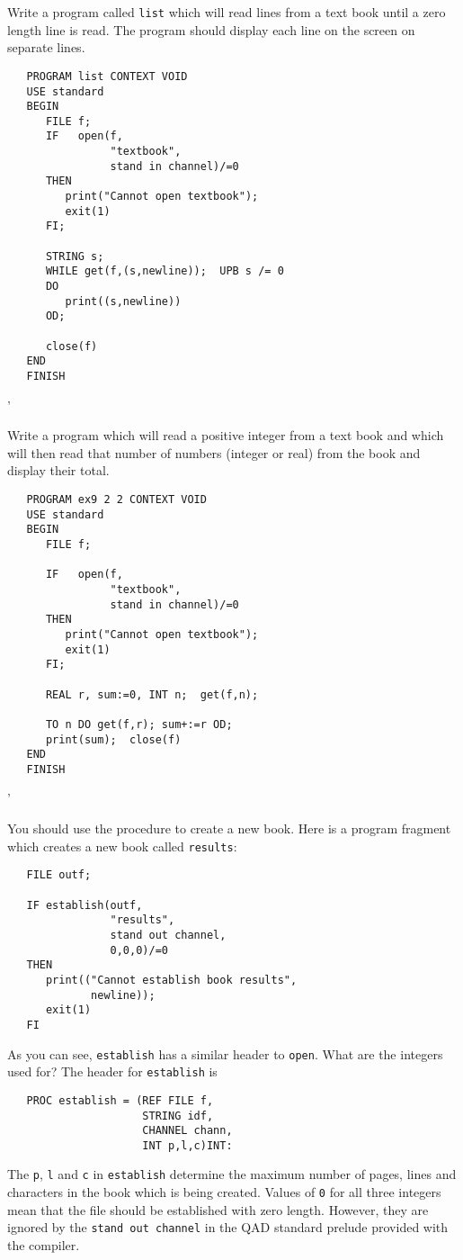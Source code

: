 \begin{exercise}
\item Write a program called \verb|list| which will read lines from a
text book until a zero length line is read.  The program should
display each line on the screen on separate lines.
\ans \ %
\begin{verbatim}
   PROGRAM list CONTEXT VOID
   USE standard
   BEGIN
      FILE f;
      IF   open(f,
                "textbook",
                stand in channel)/=0
      THEN
         print("Cannot open textbook");
         exit(1)
      FI;

      STRING s;
      WHILE get(f,(s,newline));  UPB s /= 0
      DO
         print((s,newline))
      OD;

      close(f)
   END
   FINISH
\end{verbatim}
'
\item Write a program which will read a positive integer from a text
book and which will then read that number of numbers (integer or
real) from the book and display their total.
\ans \ %
\begin{verbatim}
   PROGRAM ex9 2 2 CONTEXT VOID
   USE standard
   BEGIN
      FILE f;

      IF   open(f,
                "textbook",
                stand in channel)/=0
      THEN
         print("Cannot open textbook");
         exit(1)
      FI;

      REAL r, sum:=0, INT n;  get(f,n);

      TO n DO get(f,r); sum+:=r OD;
      print(sum);  close(f)
   END
   FINISH
\end{verbatim}
'
\end{exercise}

You should use the  procedure to create a new book.
Here is a program fragment which creates a new book called
\verb|results|:
\begin{verbatim}
   FILE outf;

   IF establish(outf,
                "results",
                stand out channel,
                0,0,0)/=0
   THEN
      print(("Cannot establish book results",
             newline));
      exit(1)
   FI
\end{verbatim}
\noindent
As you can see, \verb|establish| has a similar header to \texttt{open}.
What are the integers used for? The header for \verb|establish| is
\begin{verbatim}
   PROC establish = (REF FILE f,
                     STRING idf,
                     CHANNEL chann,
                     INT p,l,c)INT:
\end{verbatim}
\noindent
The \verb|p|, \verb|l| and \verb|c| in \verb|establish| determine the
maximum number of pages, lines and characters in the book which is
being created. Values of \verb|0| for all three integers mean that
the file should be established with zero length. However, they are
ignored by the \texttt{stand out channel} in the QAD standard prelude
provided with the 
compiler. 


